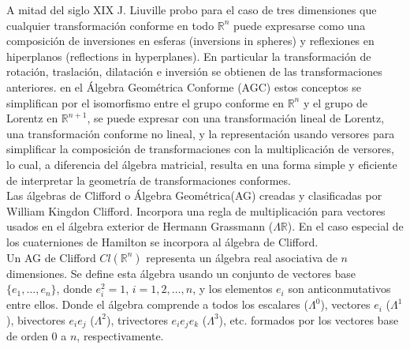        
        A mitad del siglo XIX J. Liuville probo para el caso de tres dimensiones que cualquier transformación conforme en todo $\mathbb{ R}^n$ puede expresarse como una composición de inversiones en esferas (inversions in spheres) y reflexiones en hiperplanos (reflections in hyperplanes). En particular la transformación de rotación, traslación, dilatación e inversión se obtienen de las transformaciones anteriores. en el Álgebra Geométrica Conforme (AGC) estos conceptos se simplifican por el isomorfismo entre el grupo \gls{conforme} en $\mathbb{R}^n$ y el grupo de Lorentz en $\mathbb{R}^{n+1}$, se puede expresar con una transformación lineal de Lorentz, una transformación conforme no lineal, y la representación usando versores para simplificar la composición de transformaciones  con la multiplicación de versores, lo cual, a diferencia del álgebra matricial, resulta en una forma simple y eficiente de interpretar la geometría de transformaciones conformes\cite{BayroCorrochano2010}. \\
        
        
        
        Las álgebras de  Clifford o Álgebra Geométrica(AG) creadas y clasificadas por William Kingdon Clifford. Incorpora una regla de multiplicación para vectores usados en el álgebra exterior de Hermann Grassmann ($\Lambda \mathbb{R} $). En el caso especial de los cuaterniones de Hamilton  se incorpora al álgebra de Clifford.\\
        
        
        Un AG de Clifford $Cl(\mathbb{R}^{n})$ representa un álgebra real asociativa de $n$ dimensiones. Se define esta álgebra usando un conjunto de vectores base $\{e_1,\ldots,e_n\}$, donde $e_i^2=1$, $i=1,2,\ldots,n$, y los elementos $e_i$ son anticonmutativos entre ellos. Donde el álgebra comprende a todos los escalares ($\Lambda^0$), vectores $e_i$ ($\Lambda^1$), bivectores $e_i e_j$ ($\Lambda^2$), trivectores $e_i e_j e_k$ ($\Lambda^3$), etc. formados por los vectores base de orden $0$ a $n$, respectivamente. \\
        
